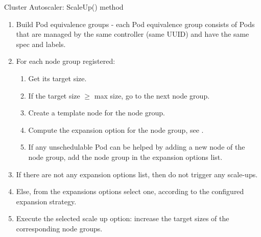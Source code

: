 \begin{algorithm}[ht]
    \caption{Cluster Autoscaler: ScaleUp() method}\label{alg:cap}
    \label{algorithm:scale-up}  
    \begin{enumerate}[leftmargin=0.5cm]
        \tightlist
        \item Build Pod equivalence groups - each Pod equivalence group consists
              of Pods that are managed by the same controller (same UUID) and have
              the same spec and labels.
        \item For each node group registered:
              \begin{enumerate}
                  \tightlist
                  \item Get its target size.
                  \item If the target size $\geq$ max size, go to the next node
                        group.
                  \item Create a template node for the node group.
                  \item Compute the expansion option for the node group, see
                        .
                  \item If any unschedulable Pod can be helped by adding a new
                        node of the node group, add the node group in the expansion
                        options list.
              \end{enumerate}
        \item If there are not any expansion options list, then do not trigger
              any scale-ups.
        \item Else, from the expansions options select one, according to the
              configured expansion strategy.
        \item Execute the selected scale up option: increase the target sizes of
              the corresponding node groups.
    \end{enumerate}
\end{algorithm}

